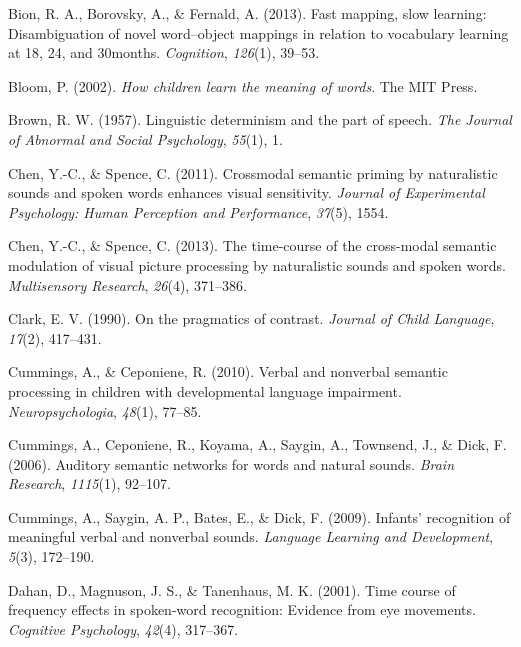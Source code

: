 \documentclass[english,floatsintext,man]{apa6}
\theoremstyle{definition}
\theoremstyle{definition}
\theoremstyle{definition}
\theoremstyle{remark}
\begin{document}
\leavevmode\hypertarget{ref-bion2013fast}{}%
Bion, R. A., Borovsky, A., \& Fernald, A. (2013). Fast mapping, slow
learning: Disambiguation of novel word--object mappings in relation to
vocabulary learning at 18, 24, and 30months. \emph{Cognition},
\emph{126}(1), 39--53.

\leavevmode\hypertarget{ref-bloom2002children}{}%
Bloom, P. (2002). \emph{How children learn the meaning of words}. The
MIT Press.

\leavevmode\hypertarget{ref-brown1957linguistic}{}%
Brown, R. W. (1957). Linguistic determinism and the part of speech.
\emph{The Journal of Abnormal and Social Psychology}, \emph{55}(1), 1.

\leavevmode\hypertarget{ref-chen2011crossmodal}{}%
Chen, Y.-C., \& Spence, C. (2011). Crossmodal semantic priming by
naturalistic sounds and spoken words enhances visual sensitivity.
\emph{Journal of Experimental Psychology: Human Perception and
Performance}, \emph{37}(5), 1554.

\leavevmode\hypertarget{ref-chen2013time}{}%
Chen, Y.-C., \& Spence, C. (2013). The time-course of the cross-modal
semantic modulation of visual picture processing by naturalistic sounds
and spoken words. \emph{Multisensory Research}, \emph{26}(4), 371--386.

\leavevmode\hypertarget{ref-clark1990pragmatics}{}%
Clark, E. V. (1990). On the pragmatics of contrast. \emph{Journal of
Child Language}, \emph{17}(2), 417--431.

\leavevmode\hypertarget{ref-cummings2010verbal}{}%
Cummings, A., \& Ceponiene, R. (2010). Verbal and nonverbal semantic
processing in children with developmental language impairment.
\emph{Neuropsychologia}, \emph{48}(1), 77--85.

\leavevmode\hypertarget{ref-cummings2006auditory}{}%
Cummings, A., Ceponiene, R., Koyama, A., Saygin, A., Townsend, J., \&
Dick, F. (2006). Auditory semantic networks for words and natural
sounds. \emph{Brain Research}, \emph{1115}(1), 92--107.

\leavevmode\hypertarget{ref-cummings2009infants}{}%
Cummings, A., Saygin, A. P., Bates, E., \& Dick, F. (2009). Infants'
recognition of meaningful verbal and nonverbal sounds. \emph{Language
Learning and Development}, \emph{5}(3), 172--190.

\leavevmode\hypertarget{ref-dahan2001time}{}%
Dahan, D., Magnuson, J. S., \& Tanenhaus, M. K. (2001). Time course of
frequency effects in spoken-word recognition: Evidence from eye
movements. \emph{Cognitive Psychology}, \emph{42}(4), 317--367.
\end{document}
